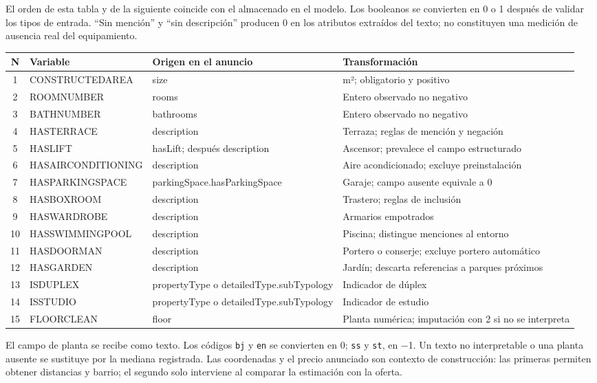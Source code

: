 \documentclass[11pt,a4paper]{article}
\newcommand{\thead}[1]{\textbf{#1}}
\begin{document}
El orden de esta tabla y de la siguiente coincide con el almacenado en el modelo. Los booleanos se convierten en 0 o 1 después de validar los tipos de entrada. ``Sin mención'' y ``sin descripción'' producen 0 en los atributos extraídos del texto; no constituyen una medición de ausencia real del equipamiento.

\begin{center}
\begin{tabularx}{\linewidth}{@{}c >{\scriptsize}l >{\scriptsize\RaggedRight\arraybackslash}p{3.5cm} L@{}}
\toprule
\thead{N} & \thead{Variable} & \thead{Origen en el anuncio} & \thead{Transformación} \\
 & CONSTRUCTEDAREA & size & m²; obligatorio y positivo \\
2 & ROOMNUMBER & rooms & Entero observado no negativo \\
3 & BATHNUMBER & bathrooms & Entero observado no negativo \\
4 & HASTERRACE & description & Terraza; reglas de mención y negación \\
5 & HASLIFT & hasLift; después description & Ascensor; prevalece el campo estructurado \\
6 & HASAIRCONDITIONING & description & Aire acondicionado; excluye preinstalación \\
7 & HASPARKINGSPACE & parkingSpace.\allowbreak hasParkingSpace & Garaje; campo ausente equivale a 0 \\
8 & HASBOXROOM & description & Trastero; reglas de inclusión \\
9 & HASWARDROBE & description & Armarios empotrados \\
10 & HASSWIMMINGPOOL & description & Piscina; distingue menciones al entorno \\
11 & HASDOORMAN & description & Portero o conserje; excluye portero automático \\
12 & HASGARDEN & description & Jardín; descarta referencias a parques próximos \\
13 & ISDUPLEX & propertyType o detailedType.subTypology & Indicador de dúplex \\
14 & ISSTUDIO & propertyType o detailedType.subTypology & Indicador de estudio \\
15 & FLOORCLEAN & floor & Planta numérica; imputación con 2 si no se interpreta \\
\bottomrule
\end{tabularx}
\end{center}

El campo de planta se recibe como texto. Los códigos \texttt{bj} y \texttt{en} se convierten en 0; \texttt{ss} y \texttt{st}, en −1. Un texto no interpretable o una planta ausente se sustituye por la mediana registrada. Las coordenadas y el precio anunciado son contexto de construcción: las primeras permiten obtener distancias y barrio; el segundo solo interviene al comparar la estimación con la oferta.
\end{document}
